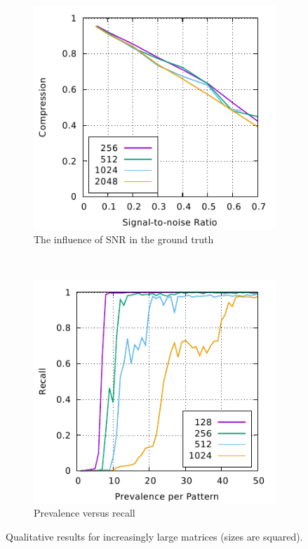 \documentclass{llncs}
\begin{document}


\begin{figure}[p]%
	\begin{subfigure}[t]{0.5\textwidth}
	\includegraphics[scale=1]{figures/experiments-gnuplottex-fig1.pdf}
	\caption{The influence of SNR in the ground truth}
	\label{fig:snr}

	\end{subfigure}%
	~
	\begin{subfigure}[t]{0.5\textwidth}
	\includegraphics[scale=1]{figures/experiments-gnuplottex-fig2.pdf}
	\caption{Prevalence versus recall}
	\label{fig:usage}
	\end{subfigure}
	\caption{Qualitative results for increasingly large matrices (sizes are squared).}
	\label{fig:plots}
\end{figure}
\end{document}
